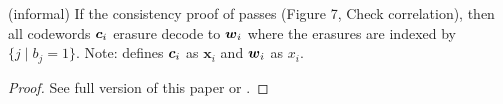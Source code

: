 



\begin{lemma}\label{lem:KOS-ci-erasure} (informal)
	If the consistency proof of \cite{C:KelOrsSch15} passes (Figure 7, Check correlation), then all codewords $\boldsymbol{c}_i$ erasure decode to $\boldsymbol{w}_i$ where the erasures are indexed by $\{j \mid b_j=1\}$. Note: \cite{C:KelOrsSch15} defines $\boldsymbol{c}_i$ as $\mathbf{x}_i$ and $\boldsymbol{w}_i$ as $x_i$.
\end{lemma}
\begin{proof}
	See full version of this paper or \cite{C:KelOrsSch15}.
\end{proof}